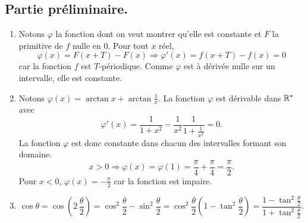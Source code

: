\subsection*{Partie préliminaire.}
\begin{enumerate}
 \item Notons $\varphi$ la fonction dont on veut montrer qu'elle est constante et $F$ la primitive de $f$ nulle en $0$. Pour tout $x$ réel,
\[
 \varphi(x) = F(x+T) - F(x) \Rightarrow \varphi'(x) = f(x+T) - f(x) = 0
\]
car la fonction $f$ est $T$-périodique. Comme $\varphi$ est à dérivée nulle sur un intervalle, elle est constante.

 \item Notons $\varphi(x) = \arctan x + \arctan \frac{1}{x}$. La fonction $\varphi$ est dérivable dans $\mathbb{R}^*$ avec 
\[
 \varphi'(x) = \frac{1}{1+x^2} - \frac{1}{x^2}\frac{1}{1+\frac{1}{x^2}} = 0.
\]
La fonction $\varphi$ est donc constante dans chacun des intervalles formant son domaine.
\[
 x>0 \Rightarrow \varphi(x) = \varphi(1) = \frac{\pi}{4} + \frac{\pi}{4} = \frac{\pi}{2}. 
\]
Pour $x<0$, $\varphi(x) = - \frac{\pi}{2}$ car la fonction est impaire.

 \item 
\[
 \cos \theta = \cos( 2\, \frac{\theta}{2}) = \cos^2 \frac{\theta}{2} - \sin^2 \frac{\theta}{2}
 = \cos^2 \frac{\theta}{2}\left( 1- \tan^2 \frac{\theta}{2}\right) 
 = \frac{1- \tan^2 \frac{\theta}{2}}{1 + \tan^2 \frac{\theta}{2}}.
\]

\end{enumerate}

